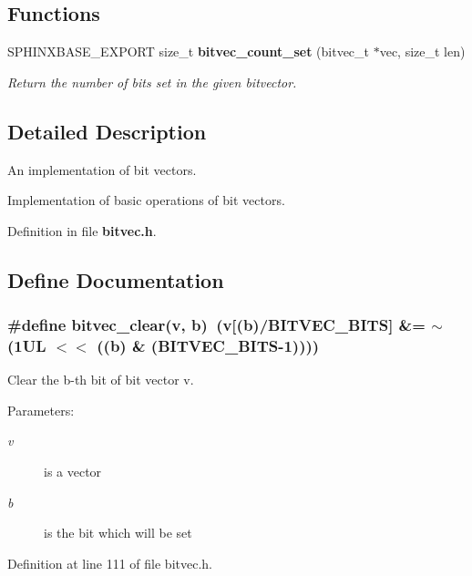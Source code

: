 \subsection*{Functions}
\begin{CompactItemize}
\item 
SPHINXBASE\_\-EXPORT size\_\-t {\bf bitvec\_\-count\_\-set} (bitvec\_\-t $\ast$vec, size\_\-t len)
\begin{CompactList}\small\item\em Return the number of bits set in the given bitvector. \item\end{CompactList}\end{CompactItemize}


\subsection{Detailed Description}
An implementation of bit vectors. 

Implementation of basic operations of bit vectors. 

Definition in file {\bf bitvec.h}.

\subsection{Define Documentation}
\subsubsection[{bitvec\_\-clear}]{\setlength{\rightskip}{0pt plus 5cm}\#define bitvec\_\-clear(v, \/  b)~(v[(b)/BITVEC\_\-BITS] \&= $\sim$(1UL $<$$<$ ((b) \& (BITVEC\_\-BITS-1))))}\label{bitvec_8h_74b3387345ca2730a8067626878843fc}


Clear the b-th bit of bit vector v. 

\begin{Desc}
\item[Parameters:]
\begin{description}
\item[{\em v}]is a vector \item[{\em b}]is the bit which will be set \end{description}
\end{Desc}


Definition at line 111 of file bitvec.h.
